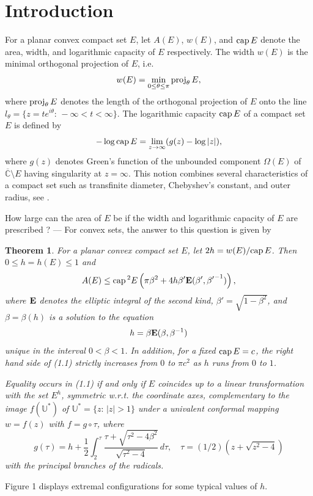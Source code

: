 \documentclass[11pt]{pjm}
\newtheorem{theorem}{Theorem}[section]
\newcommand{\be}{\begin{equation}}
\newcommand{\eeq}{\end{equation}}
\newcommand{\bt}{\begin{theorem}}
\newcommand{\et}{\end{theorem}}
\newcommand{\E}{{\bf{E}}}
\newcommand{\K}{{\bf{K}}}
\newcommand{\F}{{\bf{F}}}
\newcommand{\CAP}{{\rm cap}\,}
\newcommand{\projth}{{\rm proj}_\theta\,}
\newcommand{\C}{{\mathbb{C}}}
\newcommand{\U}{{\mathbb{U}}}
\newcommand{\CC}{\overline{\C}}
\begin{document}
\section{Introduction}
For a planar  convex compact set $E$, let $A(E)$, $w(E)$, and $\CAP E$ denote the area, width, and logarithmic 
capacity of $E$ respectively. The width $w(E)$ is the minimal orthogonal projection of $E$, i.e.
$$
w(E)=\min_{0\le\theta\le \pi} \projth E,
$$
where $\projth E$ denotes the length of the orthogonal projection of $E$ onto the line $l_\theta=\{z=te^{i\theta}:\,-\infty<t<\infty\}$.  The logarithmic 
capacity $\CAP E$ of a compact set $E$ is defined
by
$$
-\log \CAP E=\lim_{z\to \infty}(g(z)-\log |z|),
$$
where $g(z)$ denotes Green's function of the unbounded component  $\Omega(E)$ of $\CC\setminus E$ having singularity at $z=\infty$.
This notion combines several characteristics of a compact set such as transfinite diameter, Chebyshev's constant, and outer radius, see 
\cite{D,Du,H,J,PS,P}.

\medskip

How large can the area of $E$ be if the width and logarithmic capacity of $E$ are prescribed ? --- For convex sets, the answer
to this question is given by 

\bt
For a planar convex compact set $E$, let $2h=w(E)/\CAP E$. Then $0\le h=h(E)\le 1$ and
\be
 A(E)\le  \CAP^2E\left( \pi \beta^2 +4h\beta' \E(\beta',{\beta'}^{-1}) \right),
\eeq
where  $\E$ denotes the elliptic integral of the second kind, $\beta'=\sqrt{1-\beta^2}$, 
and  $\beta=\beta(h)$ is a solution to the equation 
\be
h=\beta \E (\beta,\beta^{-1})
\eeq
unique in the interval $0<\beta<1$. In addition, for a fixed $\CAP E=c$, the right hand side of (1.1) strictly increases
from $0$ to $\pi c^2$ as $h$ runs from $0$ to $1$.

Equality occurs in (1.1) if and only if $E$ coincides up to a linear transformation with the set $E^h$,  symmetric w.r.t.
the coordinate axes,  complementary to the image $f(\U^*)$ of  $\U^*=\{z:\,|z|>1\}$ under a univalent conformal mapping 
$w=f(z)$ with $f=g\circ \tau$, where 
\be
g(\tau)=h+ \frac12 \int_2^\tau \frac{\tau+\sqrt{\tau^2-4\beta^2}}{\sqrt{\tau^2-4}}\,d\tau, \quad \tau=(1/2)(z+\sqrt{z^2-4})
\eeq
with the principal branches of the radicals. 
\et

Figure 1 displays  extremal configurations  for some typical values of $h$.
\end{document}
